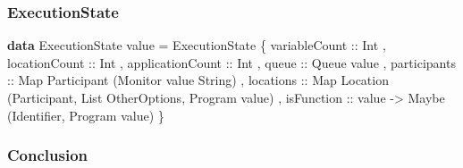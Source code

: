 \documentclass[12pt]{beamer}
\newenvironment{Shaded}{}{}
\newcommand{\KeywordTok}[1]{\textcolor[rgb]{0.00,0.44,0.13}{\textbf{#1}}}
\newcommand{\DataTypeTok}[1]{\textcolor[rgb]{0.56,0.13,0.00}{#1}}
\newcommand{\OtherTok}[1]{\textcolor[rgb]{0.00,0.44,0.13}{#1}}
\newcommand{\FunctionTok}[1]{\textcolor[rgb]{0.02,0.16,0.49}{#1}}
\newcommand{\NormalTok}[1]{#1}
\begin{document}
\begin{frame}[fragile]
\frametitle{ExecutionState}

\begin{Shaded}
\begin{Highlighting}[]
\KeywordTok{data} \DataTypeTok{ExecutionState}\NormalTok{ value }\FunctionTok{=} 
    \DataTypeTok{ExecutionState} 
\NormalTok{        \{}\OtherTok{ variableCount ::} \DataTypeTok{Int}
\NormalTok{        ,}\OtherTok{ locationCount ::} \DataTypeTok{Int}
\NormalTok{        ,}\OtherTok{ applicationCount ::} \DataTypeTok{Int}
\NormalTok{        ,}\OtherTok{ queue ::} \DataTypeTok{Queue}\NormalTok{ value}
\NormalTok{        ,}\OtherTok{ participants ::} \DataTypeTok{Map} \DataTypeTok{Participant}\NormalTok{ (}\DataTypeTok{Monitor}\NormalTok{ value }\DataTypeTok{String}\NormalTok{)}
\NormalTok{        ,}\OtherTok{ locations ::} \DataTypeTok{Map} \DataTypeTok{Location}\NormalTok{ (}\DataTypeTok{Participant}\NormalTok{, }\DataTypeTok{List} \DataTypeTok{OtherOptions}\NormalTok{, }\DataTypeTok{Program}\NormalTok{ value)}
\NormalTok{        ,}\OtherTok{ isFunction ::}\NormalTok{ value }\OtherTok{->} \DataTypeTok{Maybe}\NormalTok{ (}\DataTypeTok{Identifier}\NormalTok{, }\DataTypeTok{Program}\NormalTok{ value)}
\NormalTok{        \}}
\end{Highlighting}
\end{Shaded}

\end{frame}


\begin{frame}[fragile]
\frametitle{Conclusion}
\end{frame}
\end{document}
